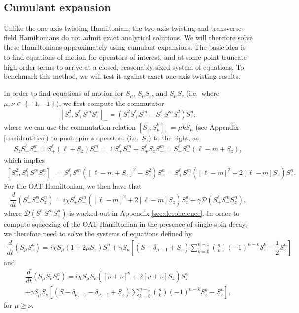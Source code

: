\documentclass[aps,notitlepage,nofootinbib,11pt]{revtex4-1}
\newcommand{\f}[2]{\dfrac{#1}{#2}} %
\newcommand{\p}[1]{\left(#1\right)} %
\renewcommand{\sp}[1]{\left[#1\right]} %
\renewcommand{\set}[1]{\left\{#1\right\}} %
\newcommand{\D}{\mathcal{D}}
\newcommand{\1}{\mathds{1}}
\begin{document}
\subsection{Cumulant expansion}

Unlike the one-axis twisting Hamiltonian, the two-axis twisting and
transverse-field Hamiltonians do not admit exact analytical
solutions. We will therefore solve these Hamiltonians approximately
using cumulant expansions.  The basic idea is to find equations of
motion for operators of interest, and at some point truncate
high-order terms to arrive at a closed, reasonably-sized system of
equations.  To benchmark this method, we will test it against exact
one-axis twisting results.

In order to find equations of motion for $S_\mu$, $S_\mu S_z$, and
$S_\mu S_\nu$ (i.e.~where $\mu,\nu\in\set{+1,-1}$), we first compute
the commutator
\begin{align}
  \sp{S_z^2, S_+^\ell S_-^m S_z^n}_-
  = \p{S_z^2 S_+^\ell S_-^m - S_+^\ell S_-^m S_z^2} S_z^n,
\end{align}
where we can use the commutation relation
$\sp{S_z,S_\mu^k}_-=\mu k S_\mu$ (see Appendix \ref{sec:identities})
to push spin-$z$ operators (i.e.~$S_z$) to the right, as
\begin{align}
  S_z S_+^\ell S_-^m
  = S_+^\ell \p{\ell + S_z} S_-^m
  = \ell S_+^\ell S_-^m + S_+^\ell S_z S_-^m
  = S_+^\ell S_-^m \p{\ell - m + S_z},
\end{align}
which implies
\begin{align}
  \sp{S_z^2, S_+^\ell S_-^m S_z^n}_-
  = S_+^\ell S_-^m \p{\sp{\ell - m + S_z}^2 - S_z^2} S_z^n
  = S_+^\ell S_-^m \p{\sp{\ell-m}^2 + 2\sp{\ell-m} S_z} S_z^n.
\end{align}
For the OAT Hamiltonian, we then have that
\begin{align}
  \f{d}{dt} \p{S_+^\ell S_-^m S_z^n}
  = i\chi S_+^\ell S_-^m \p{\sp{\ell-m}^2 + 2\sp{\ell-m} S_z} S_z^n
  + \gamma \D\p{S_+^\ell S_-^m S_z^n},
\end{align}
where $\D\p{S_+^\ell S_-^m S_z^n}$ is worked out in Appendix
\ref{sec:decoherence}.  In order to compute squeezing of the OAT
Hamiltonian in the presence of single-spin decay, we therefore need to
solve the systems of equations defined by
\begin{align}
  \f{d}{dt} \p{S_\mu S_z^n}
  = i\chi S_\mu \p{1 + 2\mu S_z} S_z^n
  + \gamma S_\mu \sp{\p{S - \delta_{\mu,-1} + S_z} \sum_{k=0}^{n-1}
    { n \choose k } \p{-1}^{n-k} S_z^k - \f12 S_z^n}
\end{align}
and
\begin{multline}
  \f{d}{dt} \p{S_\mu S_\nu S_z^n}
  = i\chi S_\mu S_\nu \p{\sp{\mu+\nu}^2 + 2 \sp{\mu+\nu} S_z} S_z^n \\
  + \gamma S_\mu S_\nu
  \sp{\p{S - \delta_{\mu,-1} - \delta_{\nu,-1} + S_z} \sum_{k=0}^{n-1}
    { n \choose k } \p{-1}^{n-k} S_z^k - S_z^n},
\end{multline}
for $\mu\ge\nu$.
\end{document}

